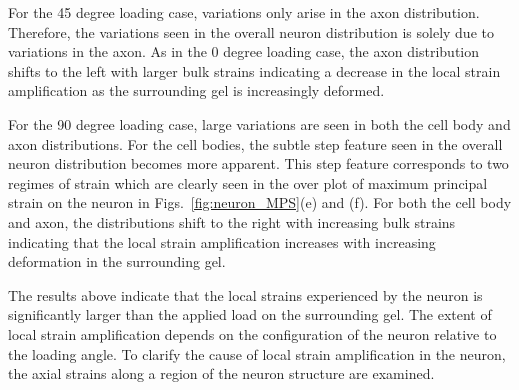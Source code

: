 \documentclass[10pt]{asme2ej}
\begin{document}
For the 45 degree loading case, variations only arise in the axon distribution. Therefore, the variations seen in the overall neuron distribution is solely due to variations in the axon. As in the 0 degree loading case, the axon distribution shifts to the left with larger bulk strains indicating a decrease in the local strain amplification as the surrounding gel is increasingly deformed.

For the 90 degree loading case, large variations are seen in both the cell body and axon distributions. For the cell bodies, the subtle step feature seen in the overall neuron distribution becomes more apparent. This step feature corresponds to two regimes of strain which are clearly seen in the over plot of maximum principal strain on the neuron in Figs.\ \ref{fig:neuron_MPS}(e) and (f). For both the cell body and axon, the distributions shift to the right with increasing bulk strains indicating that the local strain amplification increases with increasing deformation in the surrounding gel. 

The results above indicate that the local strains experienced by the neuron is significantly larger than the applied load on the surrounding gel. The extent of local strain amplification depends on the configuration of the neuron relative to the loading angle. To clarify the cause of local strain amplification in the neuron, the axial strains along a region of the neuron structure are examined.

\end{document}
